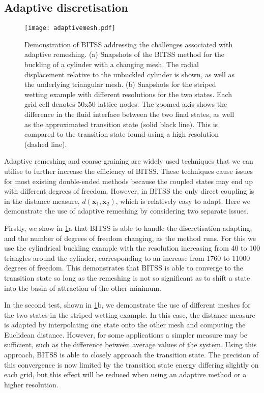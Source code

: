 \documentclass[aip,jcp,reprint,twocolumn]{revtex4-1}
\begin{document}
\subsection{Adaptive discretisation}\label{sec:adaptive}
\begin{figure}[tb]
  \texttt{[image: adaptivemesh.pdf]}
  \caption{\label{fig:adaptivemesh}
    Demonstration of BITSS addressing the challenges associated with adaptive remeshing.
    (a) Snapshots of the BITSS method for the buckling of a cylinder with a changing mesh.
        The radial displacement relative to the unbuckled cylinder is shown, as well as the underlying triangular mesh.
    (b) Snapshots for the striped wetting example with different resolutions for the two states.
        Each grid cell denotes 50x50 lattice nodes.
        The zoomed axis shows the difference in the fluid interface between the two final states, as well as the approximated transition state (solid black line).
        This is compared to the transition state found using a high resolution (dashed line).
  }
\end{figure}

Adaptive remeshing and coarse-graining are widely used techniques that we can utilise to further increase the efficiency of BITSS.
These techniques cause issues for most existing double-ended methods because the coupled states may end up with different degrees of freedom.
However, in BITSS the only direct coupling is in the distance measure, $d(\bm{x}_1,\bm{x}_2)$, which is relatively easy to adapt.
Here we demonstrate the use of adaptive remeshing by considering two separate issues.

Firstly, we show in \cref{fig:adaptivemesh}a that BITSS is able to handle the discretisation adapting, and the number of degrees of freedom changing, as the method runs.
For this we use the cylindrical buckling example with the resolution increasing from 40 to 100 triangles around the cylinder, corresponding to an increase from \num{1760} to \num{11000} degrees of freedom.
This demonstrates that BITSS is able to converge to the transition state so long as the remeshing is not so significant as to shift a state into the basin of attraction of the other minimum.

In the second test, shown in \cref{fig:adaptivemesh}b, we demonstrate the use of different meshes for the two states in the striped wetting example.
In this case, the distance measure is adapted by interpolating one state onto the other mesh and computing the Euclidean distance.
However, for some applications a simpler measure may be sufficient, such as the difference between average values of the system.
Using this approach, BITSS is able to closely approach the transition state.
The precision of this convergence is now limited by the transition state energy differing slightly on each grid, but this effect will be reduced when using an adaptive method or a higher resolution.
\end{document}
